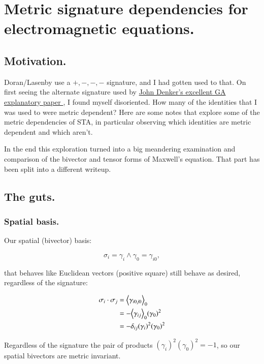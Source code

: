 \chapter{Metric signature dependencies for electromagnetic equations.}

\section{Motivation. }

Doran/Lasenby use a $+,-,-,-$ signature, and I had gotten used to that.  On first seeing the alternate signature used by 
\href{http://www.av8n.com/physics/maxwell-ga.pdf}{ John Denker's excellent GA explanatory paper }, 
I found myself disoriented.  How many of the identities that I was used to were metric dependent?   Here are some notes that explore some of the
metric dependencies of STA, in particular observing which identities are metric dependent and which aren't.

In the end this exploration turned into a big meandering examination and comparison of the bivector and tensor forms of Maxwell's equation.  That part has been split into a different writeup.

\section{The guts. }

\subsection{Spatial basis. }

Our spatial (bivector) basis:

\begin{equation*}
\sigma_i = \gamma_i \wedge \gamma_0 = \gamma_{i0},
\end{equation*}

that behaves like Euclidean vectors (positive square) still behave as desired, regardless of the signature:

\begin{align*}
\sigma_i \cdot \sigma_j
&= {\left\langle{{\gamma_{i0j0}}}\right\rangle}_{0}  \\
&= - {\left\langle{{\gamma_{ij}}}\right\rangle}_{0} (\gamma_{0})^2  \\
&= -\delta_{ij} (\gamma_i)^2 (\gamma_{0})^2
\end{align*}

Regardless of the signature the pair of products $(\gamma_i)^2 (\gamma_{0})^2 = -1$, so our spatial bivectors are metric invariant.

